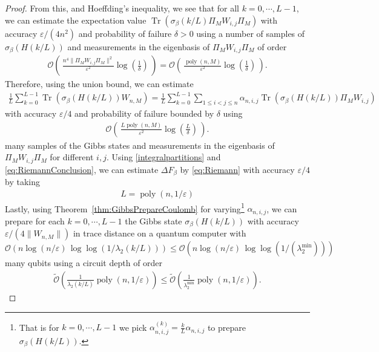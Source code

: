 \documentclass[11pt]{amsart}
\newcommand{\1}{\mathbbm{1}}
\newcommand{\Tr}{\operatorname{Tr}}
\newcommand{\eps}{\varepsilon}
\theoremstyle{plain}
\theoremstyle{definition}
\theoremstyle{remark}
\numberwithin{equation}{section}
\begin{document}
\begin{proof}
From this, and Hoeffding's inequality, we see that for all $k=0,\cdots,L-1$, we can estimate the expectation value $\Tr(\sigma_\beta(k/L)\Pi_MW_{i,j}\Pi_M)$ with accuracy $\eps/(4n^2)$ and probability of failure $\delta>0$ using a number of samples of $\sigma_\beta(H(k/L))$ and measurements in the eigenbasis of $\Pi_MW_{i,j}\Pi_M$ of order
 \begin{align}
 \label{eq:SampleComplexitySigma1}
\mathcal{O}\left(\,\frac{n^4\|\Pi_MW_{i,j}\Pi_M\|^2}{\eps^2}\log\left(\frac{1}{\delta}\right)\,\right) = \mathcal{O}\left(\,\frac{\operatorname{poly}(n,M)}{\eps^2}\log\left(\frac{1}{\delta}\right)\,\right).
 \end{align}
Therefore, using the union bound, we can estimate 
\begin{align}
\label{eq:Riemann}
   \frac{1}{L}\sum_{k=0}^{L-1}\Tr(\sigma_\beta(H(k/L)) W_{n,M}) =  \frac{1}{L}\sum_{k=0}^{L-1}\sum_{1\le i<j\le n}\alpha_{n,i,j}\Tr(\sigma_\beta(H(k/L)) \Pi_M W_{i,j})
\end{align} 
 with accuracy $\eps/4$ and probability of failure bounded by $\delta$ using 
 \begin{align}
\label{eq:SampleComplexitySigmaL}
      \mathcal{O}\left(\,\frac{L \operatorname{poly}(n,M)}{\eps^2}\log\left(\frac{L}{\delta}\right)\,\right).
 \end{align}
 many samples of the Gibbs states and measurements in the eigenbasis of $\Pi_MW_{i,j}\Pi_M$ for different $i,j$. Using \eqref{integralpartitions} and \eqref{eq:RiemannConclusion}, we can estimate $\Delta F_\beta$ by \eqref{eq:Riemann} with accuracy $\eps/4$ by taking 
 \begin{align}
 \label{eq:ScalingLandM}
     L = \operatorname{poly}(n,1/\eps) 
 \end{align}
 Lastly, using Theorem~\ref{thm:GibbsPrepareCoulomb} for varying\footnote{That is for $k=0,\cdots,L-1$ we pick $\alpha^{(k)}_{n,i,j} = \frac{k}{L}\alpha_{n,i,j}$ to prepare $\sigma_\beta(H(k/L)).$} $\alpha_{n,i,j}$, we can prepare for each $k=0,\cdots, L-1$ the Gibbs state $\sigma_\beta(H(k/L))$  with accuracy $\eps/(4\|W_{n,M}\|)$ in trace distance on a quantum computer with \\ $\mathcal{O}\left(n\log( n/\eps)\,\log\log(1/\lambda_2(k/L))\right)\le\mathcal{O}\left(n\log( n/\eps)\,\log\log(1/(\lambda^{\min}_2))\right) $ many qubits using a circuit depth of order
 \begin{align*}
\widetilde{ \mathcal{O}}\left(\frac{1}{\lambda_2(k/L)}\operatorname{poly}\left(n, 1/\eps\right)\right) \le \widetilde{ \mathcal{O}}\left(\frac{1}{\lambda^{\min}_2}\operatorname{poly}\left(n, 1/\eps\right)\right).

\end{align*}
\end{proof}
\end{document}
